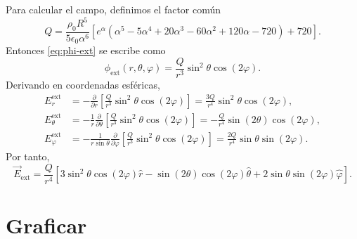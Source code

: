 \documentclass[a4paper,12pt]{article}
\begin{document}
Para calcular el campo, definimos el factor común
\begin{equation}
\label{eq:q-ext}
Q=\frac{\rho_0R^5}{5\epsilon_0\alpha^6}
\left[e^\alpha(\alpha^5-5\alpha^4+20\alpha^3-60\alpha^2+120\alpha-720)+720\right].
\end{equation}
Entonces \eqref{eq:phi-ext} se escribe como
\[
\phi_{\mathrm{ext}}(r,\theta,\varphi)=\frac{Q}{r^3}\sin^2\theta\cos(2\varphi).
\]
Derivando en coordenadas esféricas,
\begin{align*}
E_r^{\mathrm{ext}}
&=-\frac{\partial}{\partial r}\left[\frac{Q}{r^3}\sin^2\theta\cos(2\varphi)\right]
=\frac{3Q}{r^4}\sin^2\theta\cos(2\varphi),\\
E_\theta^{\mathrm{ext}}
&=-\frac{1}{r}\frac{\partial}{\partial\theta}\left[\frac{Q}{r^3}\sin^2\theta\cos(2\varphi)\right]
=-\frac{Q}{r^4}\sin(2\theta)\cos(2\varphi),\\
E_\varphi^{\mathrm{ext}}
&=-\frac{1}{r\sin\theta}\frac{\partial}{\partial\varphi}\left[\frac{Q}{r^3}\sin^2\theta\cos(2\varphi)\right]
=\frac{2Q}{r^4}\sin\theta\sin(2\varphi).
\end{align*}
Por tanto,
\begin{equation}
\label{eq:e-ext}
\boxed{
\vec E_{\mathrm{ext}}
=\frac{Q}{r^4}\left[3\sin^2\theta\cos(2\varphi)\hat r
-\sin(2\theta)\cos(2\varphi)\hat\theta
+2\sin\theta\sin(2\varphi)\hat\varphi\right].}
\end{equation}

\section{Graficar}
\end{document}
